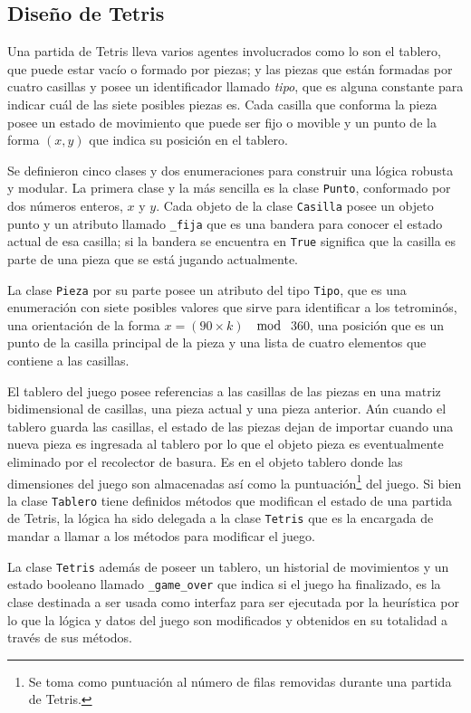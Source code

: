 \subsection{Diseño de Tetris}

Una partida de Tetris lleva varios agentes involucrados como lo son 
el tablero, que puede estar vacío o formado por piezas; y las piezas 
que están formadas por cuatro casillas y posee un identificador llamado 
\textit{tipo}, que es alguna constante para indicar cuál de las siete posibles 
piezas es. Cada casilla que conforma la pieza posee un estado de movimiento 
que puede ser fijo o movible y un punto de la forma $(x,y)$ que indica 
su posición en el tablero. 

Se definieron cinco clases y dos enumeraciones para construir una lógica 
robusta y modular. La primera clase y la más sencilla es la clase \texttt{Punto}, 
conformado por dos números enteros, $x$ y $y$. Cada objeto de la clase 
\texttt{Casilla} posee un objeto punto y un atributo llamado \texttt{\_fija} que 
es una bandera para conocer el estado actual de esa casilla; si la bandera 
se encuentra en \texttt{True} significa que la casilla es parte de una 
pieza que se está jugando actualmente.

La clase \texttt{Pieza} por su parte posee un atributo del tipo \texttt{Tipo}, que 
es una enumeración con siete posibles valores que sirve para identificar a los tetrominós, 
una orientación de la forma \linebreak $x = (90 \times k)$ $\mod$ $360$, una posición que es un punto 
de la casilla principal de la pieza y una lista de cuatro elementos que contiene 
a las casillas. 

El tablero del juego posee referencias a las casillas de las piezas en una matriz 
bidimensional de casillas, una pieza actual y una pieza anterior. Aún cuando 
el tablero guarda las casillas, el estado de las piezas dejan de importar 
cuando una nueva pieza es ingresada al tablero por 
lo que el objeto pieza es eventualmente eliminado por el recolector de basura. Es 
en el objeto tablero donde las dimensiones del juego son almacenadas así como 
la puntuación\footnote{Se toma como puntuación al número de filas removidas 
durante una partida de Tetris.} del juego. Si bien la clase \texttt{Tablero} tiene 
definidos métodos que modifican el estado de una partida de Tetris, 
la lógica ha sido delegada a la clase \texttt{Tetris} que es la encargada de 
mandar a llamar a los métodos para modificar el juego.

La clase \texttt{Tetris} además de poseer un tablero, un historial de movimientos y un 
estado booleano llamado \texttt{\_game\_over} que indica si el juego ha finalizado, 
es la clase destinada a ser usada como interfaz para ser ejecutada por la heurística 
por lo que la lógica y datos del juego son modificados y obtenidos en su 
totalidad a través de sus métodos.

